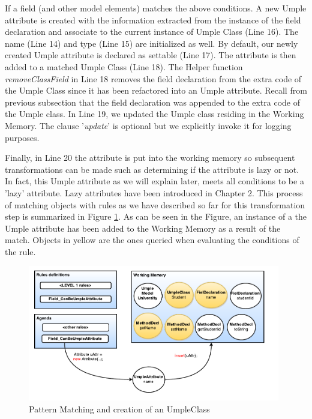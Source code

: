 If a field (and other model elements) matches the above conditions. A new Umple attribute is created with the information extracted from the instance of the field declaration and associate to the current instance of Umple Class (Line 16). The name (Line 14) and type (Line 15) are initialized as well. By default, our newly created Umple attribute is declared as settable (Line 17). The attribute is then added to a matched Umple Class (Line 18). The Helper function \textit{removeClassField} in Line 18 removes the field declaration from the extra code of the Umple Class since it has been refactored into an Umple attribute. Recall from previous subsection that the field declaration was appended to the extra code of the Umple class. In Line 19, we updated the Umple class residing in the Working Memory. The clause '\textit{update}' is optional but we explicitly invoke it for logging purposes.

Finally, in Line 20 the attribute is put into the working memory so subsequent transformations can be made such as determining if the attribute is lazy or not. In fact, this Umple attribute as we will explain later, meets all conditions to be a 'lazy' attribute. Lazy attributes have been introduced in Chapter 2. This process of matching objects with rules as we have described so far for this transformation step is summarized in Figure \ref{fig:ruleModel3}. As can be seen in the Figure, an instance of a the Umple attribute has been added to the Working Memory as a result of the match. Objects in yellow are the ones queried when evaluating the conditions of the rule. 

\begin{figure}[h]
\centering
\includegraphics[width=0.98\textwidth]{Figures/ruleModel3.pdf}
\caption{Pattern Matching and creation of an UmpleClass}
\label{fig:ruleModel3}
\end{figure}

